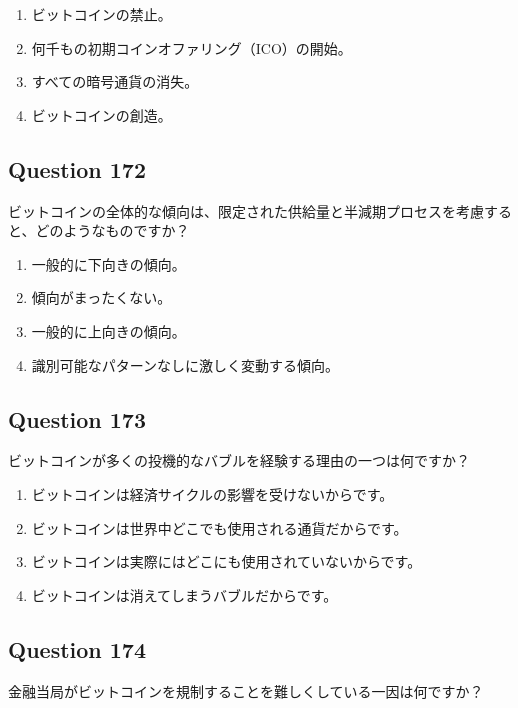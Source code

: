 \documentclass[12pt,a4paper]{article}
\begin{document}
\begin{enumerate}[label=\Alph*., leftmargin=*]
\item ビットコインの禁止。
\item 何千もの初期コインオファリング（ICO）の開始。
\item すべての暗号通貨の消失。
\item ビットコインの創造。
\end{enumerate}

\bigskip


\subsection*{Question 172}
ビットコインの全体的な傾向は、限定された供給量と半減期プロセスを考慮すると、どのようなものですか？

\begin{enumerate}[label=\Alph*., leftmargin=*]
\item 一般的に下向きの傾向。
\item 傾向がまったくない。
\item 一般的に上向きの傾向。
\item 識別可能なパターンなしに激しく変動する傾向。
\end{enumerate}

\bigskip


\subsection*{Question 173}
ビットコインが多くの投機的なバブルを経験する理由の一つは何ですか？

\begin{enumerate}[label=\Alph*., leftmargin=*]
\item ビットコインは経済サイクルの影響を受けないからです。
\item ビットコインは世界中どこでも使用される通貨だからです。
\item ビットコインは実際にはどこにも使用されていないからです。
\item ビットコインは消えてしまうバブルだからです。
\end{enumerate}

\bigskip


\subsection*{Question 174}
金融当局がビットコインを規制することを難しくしている一因は何ですか？
\end{document}
